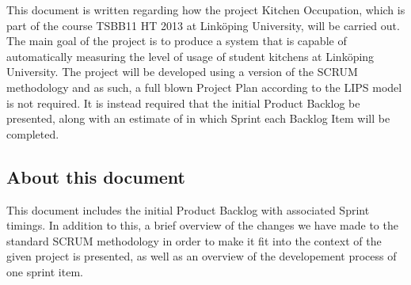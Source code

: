 

This document is written regarding how the project Kitchen Occupation, which is part of the course TSBB11 HT 2013 at Linköping University, will be carried out. The main goal of the project is to produce a system that is capable of automatically measuring the level of usage of student kitchens at Linköping University. The project will be developed using a version of the SCRUM methodology and as such, a full blown Project Plan according to the LIPS model is not required. It is instead required that the initial Product Backlog be presented, along with an estimate of in which Sprint each Backlog Item will be completed. 

\subsection{About this document}
 This document includes the initial Product Backlog with associated Sprint timings. In addition to this, a brief overview of the changes we have made to the standard SCRUM methodology in order to make it fit into the context of the given project is presented, as well as an overview of the developement process of one sprint item. 


